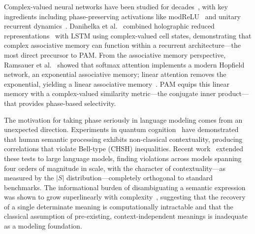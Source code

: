 \documentclass[11pt]{article}
\begin{document}
Complex-valued neural networks have been studied for decades~\cite{hirose2012complex}, with key ingredients including phase-preserving activations like modReLU~\cite{arjovsky2016unitary} and unitary recurrent dynamics~\cite{trabelsi2018deep}. Danihelka et al.~\cite{danihelka2016associative} combined holographic reduced representations~\cite{plate1995holographic} with LSTM using complex-valued cell states, demonstrating that complex associative memory can function within a recurrent architecture---the most direct precursor to PAM. From the associative memory perspective, Ramsauer et al.~\cite{ramsauer2021hopfield} showed that softmax attention implements a modern Hopfield network, an exponential associative memory; linear attention removes the exponential, yielding a linear associative memory~\cite{schlag2021linear}. PAM equips this linear memory with a complex-valued similarity metric---the conjugate inner product---that provides phase-based selectivity.

The motivation for taking phase seriously in language modeling comes from an unexpected direction. Experiments in quantum cognition~\cite{busemeyer2012quantum,bruza2023contextuality} have demonstrated that human semantic processing exhibits non-classical contextuality, producing correlations that violate Bell-type (CHSH) inequalities. Recent work~\cite{agostino2025quantum,agostino2026production} extended these tests to large language models, finding violations across models spanning four orders of magnitude in scale, with the character of contextuality---as measured by the $|S|$ distribution---completely orthogonal to standard benchmarks. The informational burden of disambiguating a semantic expression was shown to grow superlinearly with complexity~\cite{agostino2025quantum}, suggesting that the recovery of a single determinate meaning is computationally intractable and that the classical assumption of pre-existing, context-independent meanings is inadequate as a modeling foundation.
\end{document}
